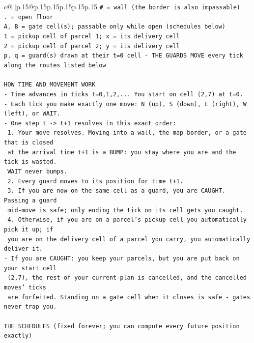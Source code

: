 \documentclass{article}
\begin{document}
{\begin{supertabular}{c@{$\;$}|p{.15\linewidth}@{}p{.15\linewidth}p{.15\linewidth}p{.15\linewidth}p{.15\linewidth}p{.15\linewidth}}
{{{\texttt{\# = wall (the border is also impassable)} \\
\texttt{. = open floor} \\
\texttt{A, B = gate cell(s); passable only while open (schedules below)} \\
\texttt{1 = pickup cell of parcel 1; x = its delivery cell} \\
\texttt{2 = pickup cell of parcel 2; y = its delivery cell} \\
\texttt{p, q = guard(s) drawn at their t=0 cell {-} THE GUARDS MOVE every tick along the routes listed below} \\
\\ 
\texttt{HOW TIME AND MOVEMENT WORK} \\
\texttt{{-} Time advances in ticks t=0,1,2,... You start on cell (2,7) at t=0.} \\
\texttt{{-} Each tick you make exactly one move: N (up), S (down), E (right), W (left), or WAIT.} \\
\texttt{{-} One step t {-}> t+1 resolves in this exact order:} \\
\texttt{  1. Your move resolves. Moving into a wall, the map border, or a gate that is closed} \\
\texttt{     at the arrival time t+1 is a BUMP: you stay where you are and the tick is wasted.} \\
\texttt{     WAIT never bumps.} \\
\texttt{  2. Every guard moves to its position for time t+1.} \\
\texttt{  3. If you are now on the same cell as a guard, you are CAUGHT. Passing a guard} \\
\texttt{     mid{-}move is safe; only ending the tick on its cell gets you caught.} \\
\texttt{  4. Otherwise, if you are on a parcel's pickup cell you automatically pick it up; if} \\
\texttt{     you are on the delivery cell of a parcel you carry, you automatically deliver it.} \\
\texttt{{-} If you are CAUGHT: you keep your parcels, but you are put back on your start cell} \\
\texttt{  (2,7), the rest of your current plan is cancelled, and the cancelled moves' ticks} \\
\texttt{  are forfeited. Standing on a gate cell when it closes is safe {-} gates never trap you.} \\
\\ 
\texttt{THE SCHEDULES (fixed forever; you can compute every future position exactly)} \\
}}}
\end{supertabular}}
\end{document}

